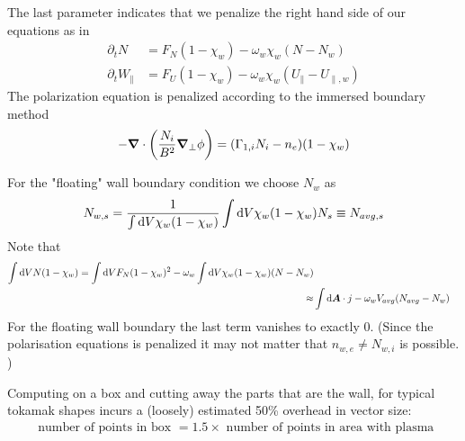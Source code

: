 \noindent
The last parameter indicates that we penalize the right hand side of our equations
as in
\begin{subequations} \label{eq:wall_equations}
\begin{align}
    \partial_t N &= F_N ( 1-\chi_w) -\omega_w\chi_w (N-N_w)\\
\partial_t W_\parallel &= F_U ( 1 - \chi_w) -\omega_w\chi_w (U_\parallel-U_{\parallel,w})
\end{align}
\end{subequations}
The polarization equation is penalized according to the immersed boundary method
\begin{align}
    -{\boldsymbol{\nabla}}\cdot\left( \frac{N_i}{B^2}{\boldsymbol{\nabla}}_{\perp} \phi \right) = (\Gamma_{1,i} N_i - n_e)(1-\chi_w)
\end{align}

For the "floating" wall boundary condition we choose $N_w$ as
\begin{align}
    N_{w,s} = \frac{1}{\int \mathrm{d} V \chi_w(1-\chi_w)}\int \mathrm{d} V \chi_w ( 1-\chi_w) N_s \equiv N_{avg,s}
\end{align}
Note that
\begin{align}
\int \mathrm{d} V N ( 1- \chi_w) = \int \mathrm{d} V F_N (1-\chi_w)^2 - \omega_w \int \mathrm{d} V \chi_w (1-\chi_w) ( N - N_w)
\nonumber\\
\approx& \int \mathrm{d} {\boldsymbol{A}}\cdot j - \omega_w V_{avg} (N_{avg} - N_w)
\end{align}
For the floating wall boundary the last term vanishes to exactly $0$. (Since the polarisation equations is
penalized it may not matter that $n_{w,e}\neq N_{w,i}$ is possible. )


\begin{tcolorbox}[title=Note]
    Computing on a box and cutting away the parts that are the wall,
    for typical tokamak shapes incurs a (loosely) estimated 50\% overhead in vector size:
    \begin{align*}
        \text{ number of points in box } = 1.5 \times \text{ number of points in area with plasma}
    \end{align*}
\end{tcolorbox}

